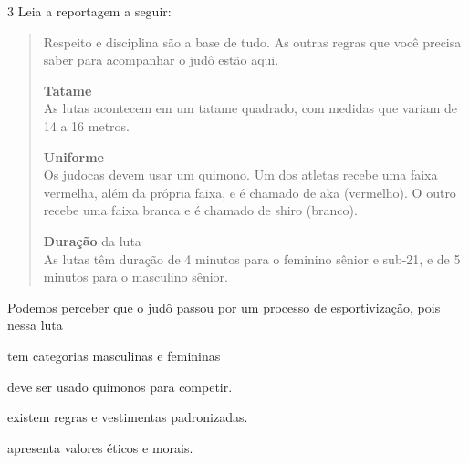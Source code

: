 
\num{3}  Leia a reportagem a seguir:

\begin{quote}
Respeito e disciplina são a base de tudo. As outras regras que você
precisa saber para acompanhar o judô estão aqui.

\textbf{Tatame}\\
As lutas acontecem em um tatame quadrado, com medidas que variam de 14 a
16 metros.

\textbf{Uniforme}\\
Os judocas devem usar um quimono. Um dos atletas recebe uma faixa
vermelha, além da própria faixa, e é chamado de aka (vermelho). O outro
recebe uma faixa branca e é chamado de shiro (branco).

\textbf{Duração} da luta\\
As lutas têm duração de 4 minutos para o feminino sênior e sub-21, e de
5 minutos para o masculino sênior.

\end{quote}

Podemos perceber que o judô passou por um processo de esportivização,
pois nessa luta

\begin{escolha}
\item tem categorias masculinas e femininas

\item deve ser usado quimonos para competir.

\item existem regras e vestimentas padronizadas.

\item apresenta valores éticos e morais.
\end{escolha}

